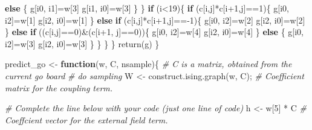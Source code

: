 \documentclass[
]{article}
\newenvironment{Shaded}{\begin{snugshade}}{\end{snugshade}}
\newcommand{\CommentTok}[1]{\textcolor[rgb]{0.56,0.35,0.01}{\textit{#1}}}
\newcommand{\ControlFlowTok}[1]{\textcolor[rgb]{0.13,0.29,0.53}{\textbf{#1}}}
\newcommand{\DecValTok}[1]{\textcolor[rgb]{0.00,0.00,0.81}{#1}}
\newcommand{\FunctionTok}[1]{\textcolor[rgb]{0.00,0.00,0.00}{#1}}
\newcommand{\NormalTok}[1]{#1}
\newcommand{\OtherTok}[1]{\textcolor[rgb]{0.56,0.35,0.01}{#1}}
\newcommand{\SpecialCharTok}[1]{\textcolor[rgb]{0.00,0.00,0.00}{#1}}
\begin{document}
\begin{Shaded}
\begin{Highlighting}[]
                \ControlFlowTok{else}\NormalTok{ \{}
\NormalTok{                    g[i0, i1]}\OtherTok{=}\NormalTok{w[}\DecValTok{3}\NormalTok{]}
\NormalTok{                    g[i1, i0]}\OtherTok{=}\NormalTok{w[}\DecValTok{3}\NormalTok{]}
\NormalTok{                \}}
\NormalTok{            \}}
            \ControlFlowTok{if}\NormalTok{ (i}\SpecialCharTok{\textless{}}\DecValTok{19}\NormalTok{)\{}
                \ControlFlowTok{if}\NormalTok{ (c[i,j]}\SpecialCharTok{*}\NormalTok{c[i}\SpecialCharTok{+}\DecValTok{1}\NormalTok{,j]}\SpecialCharTok{==}\DecValTok{1}\NormalTok{)\{}
\NormalTok{                    g[i0, i2]}\OtherTok{=}\NormalTok{w[}\DecValTok{1}\NormalTok{]}
\NormalTok{                    g[i2, i0]}\OtherTok{=}\NormalTok{w[}\DecValTok{1}\NormalTok{]}
\NormalTok{                \}}
                \ControlFlowTok{else} \ControlFlowTok{if}\NormalTok{ (c[i,j]}\SpecialCharTok{*}\NormalTok{c[i}\SpecialCharTok{+}\DecValTok{1}\NormalTok{,j]}\SpecialCharTok{=={-}}\DecValTok{1}\NormalTok{)\{}
\NormalTok{                    g[i0, i2]}\OtherTok{=}\NormalTok{w[}\DecValTok{2}\NormalTok{]}
\NormalTok{                    g[i2, i0]}\OtherTok{=}\NormalTok{w[}\DecValTok{2}\NormalTok{]}
\NormalTok{                \}   }
                \ControlFlowTok{else} \ControlFlowTok{if}\NormalTok{ ((c[i,j]}\SpecialCharTok{==}\DecValTok{0}\NormalTok{)}\SpecialCharTok{\&}\NormalTok{(c[i}\SpecialCharTok{+}\DecValTok{1}\NormalTok{, j]}\SpecialCharTok{==}\DecValTok{0}\NormalTok{))\{}
\NormalTok{                    g[i0, i2]}\OtherTok{=}\NormalTok{w[}\DecValTok{4}\NormalTok{]}
\NormalTok{                    g[i2, i0]}\OtherTok{=}\NormalTok{w[}\DecValTok{4}\NormalTok{]}
\NormalTok{                \}}
                \ControlFlowTok{else}\NormalTok{ \{}
\NormalTok{                    g[i0, i2]}\OtherTok{=}\NormalTok{w[}\DecValTok{3}\NormalTok{]}
\NormalTok{                    g[i2, i0]}\OtherTok{=}\NormalTok{w[}\DecValTok{3}\NormalTok{]}
\NormalTok{                \}}
\NormalTok{            \}}
\NormalTok{        \}}
\NormalTok{    \}}
    \FunctionTok{return}\NormalTok{(g)}
\NormalTok{\}}

\NormalTok{predict\_go }\OtherTok{\textless{}{-}} \ControlFlowTok{function}\NormalTok{(w, C, nsample)\{}
  \CommentTok{\# C is a matrix, obtained from the current go board}
  \CommentTok{\# do sampling}
\NormalTok{  W }\OtherTok{\textless{}{-}} \FunctionTok{construct.ising.graph}\NormalTok{(w, C); }\CommentTok{\# Coefficient matrix for the coupling term. }
  
  \CommentTok{\# Complete the line below with your code (just one line of code)}
\NormalTok{  h }\OtherTok{\textless{}{-}}\NormalTok{ w[}\DecValTok{5}\NormalTok{] }\SpecialCharTok{*}\NormalTok{ C }\CommentTok{\# Coeffcient vector for the external field term. }
  

\end{Highlighting}
\end{Shaded}
\end{document}
